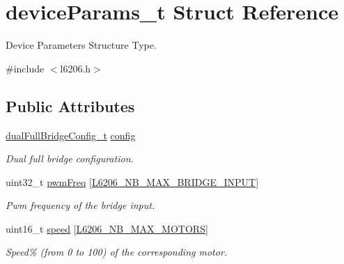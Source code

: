 \hypertarget{structdevice_params__t}{}\section{device\+Params\+\_\+t Struct Reference}
\label{structdevice_params__t}


Device Parameters Structure Type.  




{\ttfamily \#include $<$l6206.\+h$>$}

\subsection*{Public Attributes}
\begin{DoxyCompactItemize}
\item 
\mbox{\label{structdevice_params__t_ab85a421e14122b7be3738c9d8298af05}} 
\mbox{\hyperlink{group___dual___full___bridge___configuration_gab5810188b32c0f4c04abcbf058f09722}{dual\+Full\+Bridge\+Config\+\_\+t}} \mbox{\hyperlink{structdevice_params__t_ab85a421e14122b7be3738c9d8298af05}{config}}
\begin{DoxyCompactList}\small\item\em Dual full bridge configuration. \end{DoxyCompactList}\item 
\mbox{\label{structdevice_params__t_a42e0cba17c7c8325057e6f82f34e3161}} 
uint32\+\_\+t \mbox{\hyperlink{structdevice_params__t_a42e0cba17c7c8325057e6f82f34e3161}{pwm\+Freq}} \mbox{[}\mbox{\hyperlink{group___l6206___exported___constants_ga672b88d2cc08d7e4216e226f966c862b}{L6206\+\_\+\+N\+B\+\_\+\+M\+A\+X\+\_\+\+B\+R\+I\+D\+G\+E\+\_\+\+I\+N\+P\+UT}}\mbox{]}
\begin{DoxyCompactList}\small\item\em Pwm frequency of the bridge input. \end{DoxyCompactList}\item 
\mbox{\label{structdevice_params__t_aa77caca6f867297f3cf05c1867be0a9f}} 
uint16\+\_\+t \mbox{\hyperlink{structdevice_params__t_aa77caca6f867297f3cf05c1867be0a9f}{speed}} \mbox{[}\mbox{\hyperlink{group___l6206___exported___constants_ga64b1ce7748d44eb6f6973dfe8c7fd196}{L6206\+\_\+\+N\+B\+\_\+\+M\+A\+X\+\_\+\+M\+O\+T\+O\+RS}}\mbox{]}
\begin{DoxyCompactList}\small\item\em Speed\% (from 0 to 100) of the corresponding motor. \end{DoxyCompactList}\item 

\end{DoxyCompactItemize}

